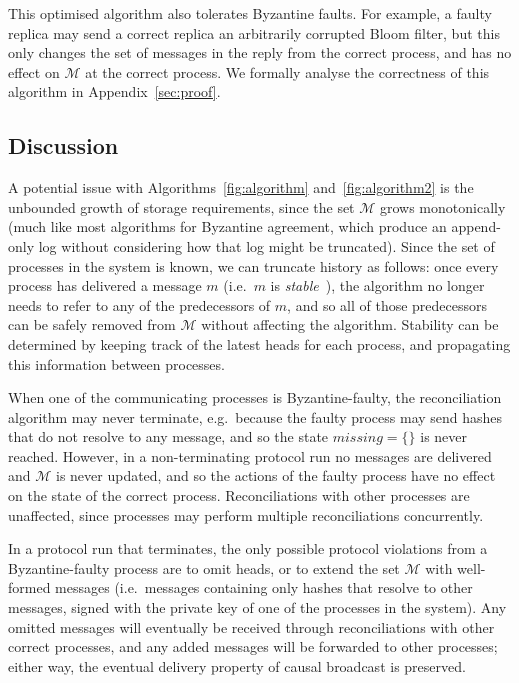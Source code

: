 \documentclass[a4paper,anonymous,USenglish]{lipics-v2019}
\begin{document}
This optimised algorithm also tolerates Byzantine faults.
For example, a faulty replica may send a correct replica an arbitrarily corrupted Bloom filter, but this only changes the set of messages in the reply from the correct process, and has no effect on $\mathcal{M}$ at the correct process.
We formally analyse the correctness of this algorithm in Appendix~\ref{sec:proof}.

\subsection{Discussion}

A potential issue with Algorithms~\ref{fig:algorithm} and~\ref{fig:algorithm2} is the unbounded growth of storage requirements, since the set $\mathcal{M}$ grows monotonically (much like most algorithms for Byzantine agreement, which produce an append-only log without considering how that log might be truncated).
Since the set of processes in the system is known, we can truncate history as follows: once every process has delivered a message $m$ (i.e.\ $m$ is \emph{stable}~\cite{Birman:1991el}), the algorithm no longer needs to refer to any of the predecessors of $m$, and so all of those predecessors can be safely removed from $\mathcal{M}$ without affecting the algorithm.
Stability can be determined by keeping track of the latest heads for each process, and propagating this information between processes.

When one of the communicating processes is Byzantine-faulty, the reconciliation algorithm may never terminate, e.g.\ because the faulty process may send hashes that do not resolve to any message, and so the state $\mathit{missing} = \{\}$ is never reached.
However, in a non-terminating protocol run no messages are delivered and $\mathcal{M}$ is never updated, and so the actions of the faulty process have no effect on the state of the correct process.
Reconciliations with other processes are unaffected, since processes may perform multiple reconciliations concurrently.

In a protocol run that terminates, the only possible protocol violations from a Byzantine-faulty process are to omit heads, or to extend the set $\mathcal{M}$ with well-formed messages (i.e.\ messages containing only hashes that resolve to other messages, signed with the private key of one of the processes in the system).
Any omitted messages will eventually be received through reconciliations with other correct processes, and any added messages will be forwarded to other processes; either way, the eventual delivery property of causal broadcast is preserved.
\end{document}
